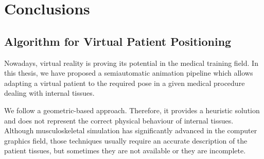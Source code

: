 \chapter*{Conclusions}
\label{cap:conclu}

\section{Algorithm for Virtual Patient Positioning}
\label{conclu:posing}

Nowadays, virtual reality is proving its potential in the medical training  field.  
In this thesis, we have proposed a semiautomatic animation pipeline which allows adapting a virtual patient to the required pose in a given medical procedure dealing with internal tissues.  

We follow a geometric-based approach. Therefore, it provides a heuristic solution and does not represent the correct physical behaviour of internal tissues. Although musculoskeletal  simulation  has  significantly  advanced in  the  computer  graphics field, those techniques usually require an accurate description of the patient tissues, but sometimes they are not available or they are incomplete.


